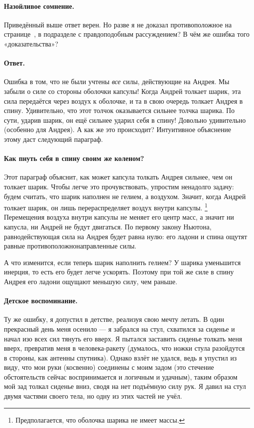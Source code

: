 \paragraph{Назойливое сомнение.}
Приведённый выше ответ верен.
Но разве я не доказал противоположное на странице~\pageref{Првдоподобное рассуждение}, в подразделе с правдоподобным рассуждением?
В чём же ошибка того «доказательства»?

\paragraph{Ответ.}
Ошибка в том, что не были учтены \emph{все} силы, действующие на Андрея.
Мы забыли о силе со стороны оболочки капсулы!
Когда Андрей толкает шарик, эта сила передаётся через воздух к оболочке, и та в свою очередь толкает Андрея в спину.
Удивительно, что этот толчок оказывается сильнее толчка шарика.
По сути, ударив шарик, он ещё сильнее ударил себя в спину!
Довольно удивительно (особенно для Андрея).
А как же это происходит?
Интуитивное объяснение этому даст следующий параграф.

\paragraph{Как пнуть себя в спину своим же коленом?}
Этот параграф объяснит, как может капсула толкать Андрея сильнее, чем он толкает шарик.
Чтобы легче это прочувствовать, упростим ненадолго задачу:
будем считать, что шарик наполнен не гелием, а воздухом.
Значит, когда Андрей толкает шарик, он лишь перераспределяет воздух внутри капсулы.%
\footnote{Предполагается, что оболочка шарика не имеет массы.}
Перемещения воздуха внутри капсулы не меняет его центр масс, а значит ни капусла, ни Андрей не будут двигаться.
По первому закону Ньютона, равнодействующая сила на Андрея будет равна нулю: его ладони и спина ощутят равные противоположнонаправленные силы.

А что изменится, если теперь шарик наполнить гелием?
У шарика уменьшится инерция, то есть его будет легче ускорять.
Поэтому при той же силе в спину Андрея его ладони ощущают меньшую силу, чем раньше.

\paragraph{Детское воспоминание.}
Ту же ошибку, я допустил в детстве, реализуя свою мечту летать.
В один прекрасный день меня осенило --- я забрался на стул, схватился за сиденье и начал изо всех сил тянуть его вверх.
Я пытался заставить сиденье толкать меня вверх, превратив меня в человека-ракету (думалось, что ножки стула разойдутся в стороны, как антенны спутника).
Однако взлёт не удался, ведь я упустил из виду, что мои руки (косвенно) соединены с моим задом
(это стечение обстоятельств сейчас воспринимается и логичным и удачным),
таким образом мой зад толкал сиденье вниз, сводя на нет подъёмную силу рук.
Я давил на стул двумя частями своего тела, но одну из этих частей не учёл.

